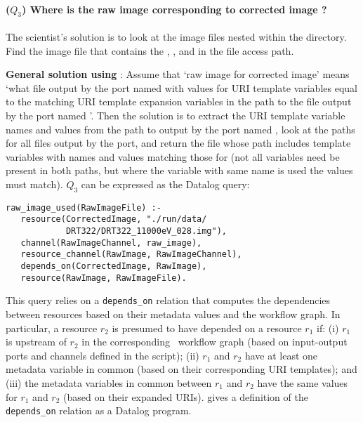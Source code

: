 \paragraph{($Q_3$)
  Where is the raw image corresponding to corrected image
  ?}
The scientist's solution is to look at the image files nested within
the  directory.  Find the image file that contains the
, , and  in the file access
path.

\textbf{General solution using \yw}: Assume that `raw image for
corrected image' means `what file output by the port named
 with values for URI template variables equal to the
matching URI template expansion variables in the path to the file
 output by the port named
'.  Then the solution is to extract the URI
template variable names and values from the path to
 output by the port named
, look at the paths for all files output by the
 port, and return the file whose path includes
template variables with names and values matching those for
 (not all variables need be present in
both paths, but where the variable with same name is used the values
must match).  $Q_3$ can be expressed as the Datalog query: 
\begin{small}
\begin{verbatim}
raw_image_used(RawImageFile) :-
   resource(CorrectedImage, "./run/data/
            DRT322/DRT322_11000eV_028.img"),
   channel(RawImageChannel, raw_image),
   resource_channel(RawImage, RawImageChannel),
   depends_on(CorrectedImage, RawImage),
   resource(RawImage, RawImageFile).
\end{verbatim}
\end{small}
This query relies on a {\tt depends\_on} relation that computes the
dependencies between resources based on their metadata values and the
workflow graph. In particular, a resource $r_2$ is presumed to have
depended on a resource $r_1$ if: (i) $r_1$ is upstream of $r_2$ in the
corresponding \YW\ workflow graph (based on input-output ports and
channels defined in the script); (ii) $r_1$ and $r_2$ have at least
one metadata variable in common (based on their corresponding URI
templates); and (iii) the metadata variables in common between $r_1$
and $r_2$ have the same values for $r_1$ and $r_2$ (based on their
expanded URIs).  gives a definition of the {\tt
  depends\_on} relation as a Datalog program.

